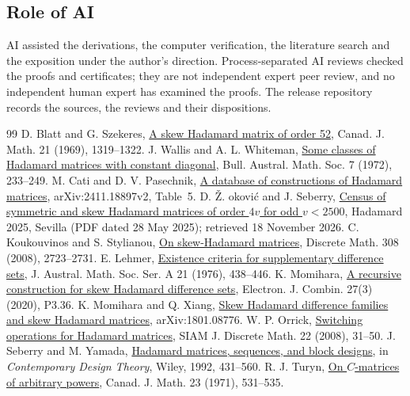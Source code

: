 \documentclass[11pt]{article}
\theoremstyle{remark}
\begin{document}
\subsection*{Role of AI}
AI assisted the derivations, the computer verification, the literature
search and the exposition under the author's direction. Process-separated AI
reviews checked the proofs and certificates; they are not independent expert
peer review, and no independent human expert has examined the proofs. The
release repository records the sources, the reviews and their dispositions.

\begin{thebibliography}{99}\small
{} D. Blatt and G. Szekeres, \href{https://doi.org/10.4153/CJM-1969-144-2}{A skew Hadamard matrix of order 52}, Canad. J. Math. 21 (1969), 1319--1322.
 J. Wallis and A. L. Whiteman, \href{https://doi.org/10.1017/S0004972700044993}{Some classes of Hadamard matrices with constant diagonal}, Bull. Austral. Math. Soc. 7 (1972), 233--249.
 M. Cati and D. V. Pasechnik, \href{https://arxiv.org/abs/2411.18897}{A database of constructions of Hadamard matrices}, arXiv:2411.18897v2, Table~5.
 D. \v{Z}. \DJ{}okovi\'c and J. Seberry, \href{https://us.ticmeet.com/assets/archivos/d6f1d9b8-d39f-4888-925a-7eb81c4905cc/jenni-paper.pdf}{Census of symmetric and skew Hadamard matrices of order $4v$ for odd $v<2500$}, Hadamard 2025, Sevilla (PDF dated 28 May 2025); retrieved 18 November 2026.
 C. Koukouvinos and S. Stylianou, \href{https://doi.org/10.1016/j.disc.2006.06.037}{On skew-Hadamard matrices}, Discrete Math. 308 (2008), 2723--2731.
 E. Lehmer, \href{https://doi.org/10.1017/S1446788700019273}{Existence criteria for supplementary difference sets}, J. Austral. Math. Soc. Ser. A 21 (1976), 438--446.
 K. Momihara, \href{https://doi.org/10.37236/9058}{A recursive construction for skew Hadamard difference sets}, Electron. J. Combin. 27(3) (2020), P3.36.
 K. Momihara and Q. Xiang, \href{https://arxiv.org/abs/1801.08776}{Skew Hadamard difference families and skew Hadamard matrices}, arXiv:1801.08776.
 W. P. Orrick, \href{https://arxiv.org/abs/math/0507515}{Switching operations for Hadamard matrices}, SIAM J. Discrete Math. 22 (2008), 31--50.
 J. Seberry and M. Yamada, \href{https://documents.uow.edu.au/~jennie/WEBPDF/175_1992.pdf}{Hadamard matrices, sequences, and block designs}, in \emph{Contemporary Design Theory}, Wiley, 1992, 431--560.
 R. J. Turyn, \href{https://doi.org/10.4153/CJM-1971-056-0}{On $C$-matrices of arbitrary powers}, Canad. J. Math. 23 (1971), 531--535.
\end{thebibliography}
\end{document}
